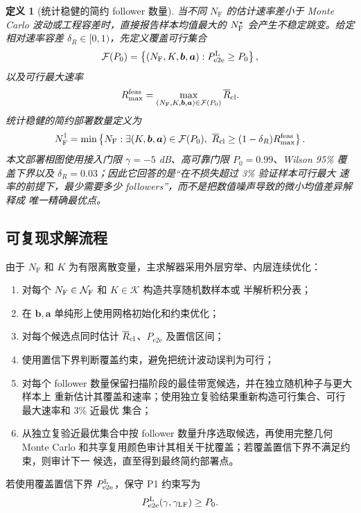 \documentclass[UTF8,a4paper,11pt]{ctexart}
\newtheorem{definition}{定义}[section]
\newcommand{\NF}{N_{\mathrm F}}
\newcommand{\Pe}{P_{\mathrm{e2e}}}
\newcommand{\Rbar}{\overline R}
\newcommand{\bvec}{\bm b}
\newcommand{\avec}{\bm a}
\begin{document}
\begin{definition}[统计稳健的简约 follower 数量]
当不同 $\NF$ 的估计速率差小于 Monte Carlo 波动或工程容差时，直接报告样本均值最大的
$N_{\rm F}^{\star}$ 会产生不稳定跳变。给定相对速率容差
$\delta_R\in[0,1)$，先定义覆盖可行集合
\begin{equation}
 \mathcal F(P_0)
 =
 \left\{
 (\NF,K,\bvec,\avec):
 \Pe^{\rm L}\geq P_0
 \right\},
 \label{eq:coverage-feasible-set}
\end{equation}
以及可行最大速率
\begin{equation}
 R_{\max}^{\rm feas}
 =
 \max_{(\NF,K,\bvec,\avec)\in\mathcal F(P_0)}
 \Rbar_{\rm cl}.
 \label{eq:maximum-feasible-rate}
\end{equation}
统计稳健的简约部署数量定义为
\begin{equation}
 N_{\rm F}^{\dagger}
 =
 \min\left\{
 \NF:
 \exists(K,\bvec,\avec)\in\mathcal F(P_0),\
 \Rbar_{\rm cl}\geq(1-\delta_R)R_{\max}^{\rm feas}
 \right\}.
 \label{eq:parsimonious-follower-count}
\end{equation}
本文部署相图使用接入门限 $\gamma=-5$ dB、高可靠门限 $P_0=0.99$、Wilson 95\%
覆盖下界以及 $\delta_R=0.03$；因此它回答的是“在不损失超过 3\% 验证样本可行最大
速率的前提下，最少需要多少 followers”，而不是把数值噪声导致的微小均值差异解释成
唯一精确最优点。
\end{definition}

\subsection{可复现求解流程}

由于 $\NF$ 和 $K$ 为有限离散变量，主求解器采用外层穷举、内层连续优化：
\begin{enumerate}[leftmargin=2em]
  \item 对每个 $\NF\in\mathcal N_{\rm F}$ 和 $K\in\mathcal K$ 构造共享随机数样本或
  半解析积分表；
  \item 在 $\bvec,\avec$ 单纯形上使用网格初始化和约束优化；
  \item 对每个候选点同时估计 $\Rbar_{\rm cl}$、$\Pe$ 及置信区间；
  \item 使用置信下界判断覆盖约束，避免把统计波动误判为可行；
  \item 对每个 follower 数量保留扫描阶段的最佳带宽候选，并在独立随机种子与更大样本上
  重新估计其覆盖和速率；使用独立复验结果重新构造可行集合、可行最大速率和 3\% 近最优
  集合；
  \item 从独立复验近最优集合中按 follower 数量升序选取候选，再使用完整几何
  Monte Carlo 和共享复用颜色审计其相关干扰覆盖；若覆盖置信下界不满足约束，则审计下一
  候选，直至得到最终简约部署点。
\end{enumerate}
若使用覆盖置信下界 $\Pe^{\rm L}$，保守 P1 约束写为
\begin{equation}
 \Pe^{\rm L}(\gamma,\gamma_{\rm LF})\geq P_0.
 \label{eq:conservative-coverage-constraint}
\end{equation}
\end{document}
